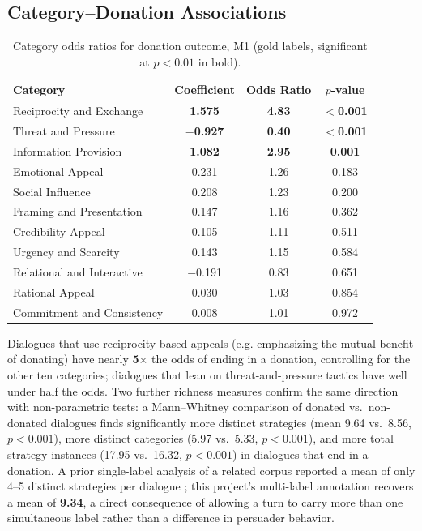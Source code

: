 \subsection{Category--Donation Associations}

\begin{table}[H]
\centering
\caption{Category odds ratios for donation outcome, M1 (gold labels, significant at $p<0.01$ in bold).}
\label{tab:odds-ratios}
\begin{tabular}{@{}lccc@{}}
\toprule
\textbf{Category} & \textbf{Coefficient} & \textbf{Odds Ratio} & \textbf{$p$-value} \\
\midrule
Reciprocity and Exchange & \textbf{1.575} & \textbf{4.83} & \textbf{$<$0.001} \\
Threat and Pressure & \textbf{$-$0.927} & \textbf{0.40} & \textbf{$<$0.001} \\
Information Provision & \textbf{1.082} & \textbf{2.95} & \textbf{0.001} \\
Emotional Appeal & 0.231 & 1.26 & 0.183 \\
Social Influence & 0.208 & 1.23 & 0.200 \\
Framing and Presentation & 0.147 & 1.16 & 0.362 \\
Credibility Appeal & 0.105 & 1.11 & 0.511 \\
Urgency and Scarcity & 0.143 & 1.15 & 0.584 \\
Relational and Interactive & $-$0.191 & 0.83 & 0.651 \\
Rational Appeal & 0.030 & 1.03 & 0.854 \\
Commitment and Consistency & 0.008 & 1.01 & 0.972 \\
\bottomrule
\end{tabular}
\end{table}

Dialogues that use reciprocity-based appeals (e.g. emphasizing the mutual
benefit of donating) have nearly \textbf{5$\times$} the odds of ending in a
donation, controlling for the other ten categories; dialogues that lean on
threat-and-pressure tactics have well under half the odds. Two further
richness measures confirm the same direction with non-parametric tests: a
Mann--Whitney comparison of donated vs.\ non-donated dialogues finds
significantly more distinct strategies (mean 9.64 vs.\ 8.56, $p<0.001$),
more distinct categories (5.97 vs.\ 5.33, $p<0.001$), and more total
strategy instances (17.95 vs.\ 16.32, $p<0.001$) in dialogues that end in a
donation. A prior single-label analysis of a related corpus reported a mean
of only 4--5 distinct strategies per dialogue \citep{petrova_singlelabel};
this project's multi-label annotation recovers a mean of \textbf{9.34}, a
direct consequence of allowing a turn to carry more than one simultaneous
label rather than a difference in persuader behavior.

